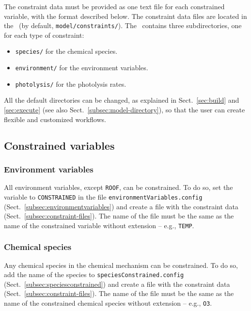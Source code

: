The constraint data must be provided as one text file for each constrained variable, with the
format described below. The constraint data files are located in the \constrdir\ (by default,
\texttt{model/constraints/}). The \constrdir\ contains three subdirectories, one for each type
of constraint:

\begin{itemize}
\item \texttt{species/} for the chemical species.
\item \texttt{environment/} for the environment variables.
\item \texttt{photolysis/} for the photolysis rates.
\end{itemize}

All the default directories can be changed, as explained in Sect.~\ref{sec:build} and
\ref{sec:execute} (see also Sect.~\ref{subsec:model-directory}), so that the user can create
flexible and customized workflows.

\subsection{Constrained variables} \label{subsec:constrained-variables}

\subsubsection{Environment variables}

All environment variables, except \texttt{ROOF}, can be constrained. To do so, set the variable
to \texttt{CONSTRAINED} in the file \texttt{environmentVariables.config}
(Sect.~\ref{subsec:environmentvariables}) and create a file with the constraint data
(Sect.~\ref{subsec:constraint-files}). The name of the file must be the same as the name of the
constrained variable without extension -- e.g., \texttt{TEMP}.

\subsubsection{Chemical species}

Any chemical species in the chemical mechanism can be constrained. To do so, add the name of
the species to \texttt{speciesConstrained.config} (Sect.~\ref{subsec:speciesconstrained}) and
create a file with the constraint data (Sect.~\ref{subsec:constraint-files}). The name of the
file must be the same as the name of the constrained chemical species without extension --
e.g., \texttt{O3}.


